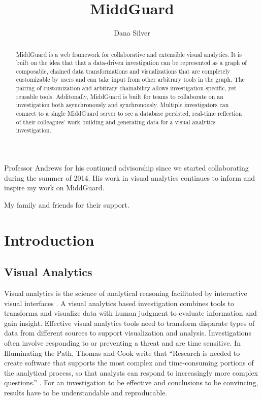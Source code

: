 \documentclass[midd]{thesis}
\title {MiddGuard}
\author {Dana Silver}
\begin{document}
\maketitle

\begin{abstract}

MiddGuard is a web framework for collaborative and extensible visual analytics.
It is built on the idea that that a data-driven investigation can be represented
as a graph of composable, chained data transformations and visualizations that
are completely customizable by users and can take input from other arbitrary
tools in the graph. The pairing of customization and arbitrary chainability
allows investigation-specific, yet reusable tools. Additonally, MiddGuard is
built for teams to collaborate on an investigation both asynchronously and
synchronously. Multiple investigators can connect to a single MiddGuard server
to see a database persisted, real-time reflection of their colleagues' work
building and generating data for a visual analytics investigation.

\end{abstract}

\begin{acknowledgements}

Professor Andrews for his continued advisorship since we started collaborating
during the summer of 2014. His work in visual analytics continues to inform and
inspire my work on MiddGuard.

My family and friends for their support.

\end{acknowledgements}

\contentspage
\figurelistpage

\normalspacing \setcounter{page}{1} 

\chapter{Introduction}

\section{Visual Analytics}

Visual analytics is the science of analytical reasoning facilitated by
interactive visual interfaces \cite{illuminate}. A visual analytics based
investigation combines tools to transforma and visualize data with
human judgment to evaluate information and gain insight. Effective visual
analytics tools need to transform disparate types of data from different sources
to support visualization and analysis. Investigations often involve responding
to or preventing a threat and are time sensitive. In Illuminating the Path,
Thomas and Cook write that ``Research is needed to create software that supports
the most complex and time-consuming portions of the analytical process, so that
analysts can respond to increasingly more complex questions.''
\cite{illuminate}. For an investigation to be effective and conclusions to be
convincing, results have to be understandable and reproducable.
\end{document}
